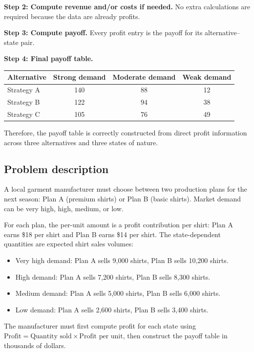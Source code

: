 \begin{ExamProblems}
		\textbf{Step 2: Compute revenue and/or costs if needed.} No extra calculations are required because the data are already profits.
		
		\textbf{Step 3: Compute payoff.} Every profit entry is the payoff for its alternative--state pair.
		
		\textbf{Step 4: Final payoff table.}
		\begin{center}
			\begin{tabular}{l c c c}
				\toprule
				Alternative & Strong demand & Moderate demand & Weak demand \\
				\midrule
				Strategy A & 140 & 88 & 12 \\
				Strategy B & 122 & 94 & 38 \\
				Strategy C & 105 & 76 & 49 \\
				\bottomrule
			\end{tabular}
		\end{center}
		
		Therefore, the payoff table is correctly constructed from direct profit information across three alternatives and three states of nature.
		
		\item
		\subsection*{Problem description}
		A local garment manufacturer must choose between two production plans for the next season: Plan A (premium shirts)
		or Plan B (basic shirts). Market demand can be very high, high, medium, or low.
		
		For each plan, the per-unit amount is a profit contribution per shirt: Plan A earns \$18 per shirt and Plan B earns \$14 per shirt.
		The state-dependent quantities are expected shirt sales volumes:
		\begin{itemize}
			\item Very high demand: Plan A sells 9{,}000 shirts, Plan B sells 10{,}200 shirts.
			\item High demand: Plan A sells 7{,}200 shirts, Plan B sells 8{,}300 shirts.
			\item Medium demand: Plan A sells 5{,}000 shirts, Plan B sells 6{,}000 shirts.
			\item Low demand: Plan A sells 2{,}600 shirts, Plan B sells 3{,}400 shirts.
		\end{itemize}
		
		The manufacturer must first compute profit for each state using
		\(\text{Profit}=\text{Quantity sold}\times\text{Profit per unit}\), then construct the payoff table in thousands of dollars.

\end{ExamProblems}
